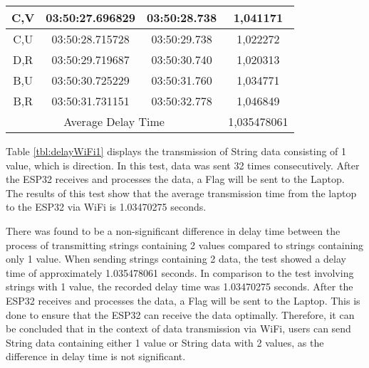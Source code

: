 \begin{table}[!ht]
\begin{tabular}{|ccc|c|}
  \multicolumn{1}{|c|}{C,V}  & \multicolumn{1}{c|}{03:50:27.696829} & 03:50:28.738       & 1,041171    \\ \hline
  \multicolumn{1}{|c|}{C,U}  & \multicolumn{1}{c|}{03:50:28.715728} & 03:50:29.738       & 1,022272    \\ \hline
  \multicolumn{1}{|c|}{D,R}  & \multicolumn{1}{c|}{03:50:29.719687} & 03:50:30.740       & 1,020313    \\ \hline
  \multicolumn{1}{|c|}{B,U}  & \multicolumn{1}{c|}{03:50:30.725229} & 03:50:31.760       & 1,034771    \\ \hline
  \multicolumn{1}{|c|}{B,R}  & \multicolumn{1}{c|}{03:50:31.731151} & 03:50:32.778       & 1,046849    \\ \hline
  \multicolumn{3}{|c|}{Average Delay Time}                                               & 1,035478061 \\ \hline
  \end{tabular}
\end{table}

Table \ref{tbl:delayWiFi1} displays the transmission of String data consisting of 1 value, which is direction. In this test, data was sent 32 times consecutively. After the ESP32 receives and processes the data, a Flag will be sent to the Laptop. The results of this test show that the average transmission time from the laptop to the ESP32 via WiFi is 1.03470275 seconds.

There was found to be a non-significant difference in delay time between the process of transmitting strings containing 2 values compared to strings containing only 1 value. When sending strings containing 2 data, the test showed a delay time of approximately 1.035478061 seconds. In comparison to the test involving strings with 1 value, the recorded delay time was 1.03470275 seconds. After the ESP32 receives and processes the data, a Flag will be sent to the Laptop. This is done to ensure that the ESP32 can receive the data optimally. Therefore, it can be concluded that in the context of data transmission via WiFi, users can send String data containing either 1 value or String data with 2 values, as the difference in delay time is not significant.

